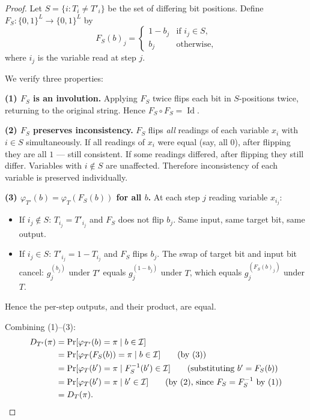 \documentclass[version=submission]{iacrcc}
\DeclareMathOperator{\Id}{Id}
\begin{document}
\begin{proof}
Let $S = \{i : T_i \neq T'_i\}$ be the set of differing bit positions.
Define $F_S : \{0,1\}^L \to \{0,1\}^L$ by
\[
F_S(b)_j =
\begin{cases}
1 - b_j & \text{if } i_j \in S, \\
b_j & \text{otherwise},
\end{cases}
\]
where $i_j$ is the variable read at step $j$.

We verify three properties:

\textbf{(1) $F_S$ is an involution.}
Applying $F_S$ twice flips each bit in $S$-positions twice, returning to
the original string. Hence $F_S \circ F_S = \Id$.

\textbf{(2) $F_S$ preserves inconsistency.}
$F_S$ flips \emph{all} readings of each variable $x_i$ with $i \in S$
simultaneously. If all readings of $x_i$ were equal (say, all $0$), after
flipping they are all $1$ --- still consistent. If some readings differed,
after flipping they still differ. Variables with $i \notin S$ are unaffected.
Therefore inconsistency of each variable is preserved individually.

\textbf{(3) $\varphi_{T'}(b) = \varphi_T(F_S(b))$ for all $b$.}
At each step $j$ reading variable $x_{i_j}$:
\begin{itemize}[nosep]
\item If $i_j \notin S$: $T_{i_j} = T'_{i_j}$ and $F_S$ does not flip $b_j$.
  Same input, same target bit, same output.
\item If $i_j \in S$: $T'_{i_j} = 1 - T_{i_j}$ and $F_S$ flips $b_j$.
  The swap of target bit and input bit cancel:
  $g_j^{(b_j)}$ under $T'$ equals $g_j^{(1-b_j)}$ under $T$, which equals
  $g_j^{(F_S(b)_j)}$ under $T$.
\end{itemize}
Hence the per-step outputs, and their product, are equal.

Combining (1)--(3):
\begin{align*}
D_{T'}(\pi) &= \Pr[\varphi_{T'}(b) = \pi \mid b \in \mathcal{I}] \\
&= \Pr[\varphi_T(F_S(b)) = \pi \mid b \in \mathcal{I}] \tag{by (3)} \\
&= \Pr[\varphi_T(b') = \pi \mid F_S^{-1}(b') \in \mathcal{I}]
\tag{substituting $b' = F_S(b)$} \\
&= \Pr[\varphi_T(b') = \pi \mid b' \in \mathcal{I}]
\tag{by (2), since $F_S = F_S^{-1}$ by (1)} \\
&= D_T(\pi). \qedhere
\end{align*}
\end{proof}
\end{document}
